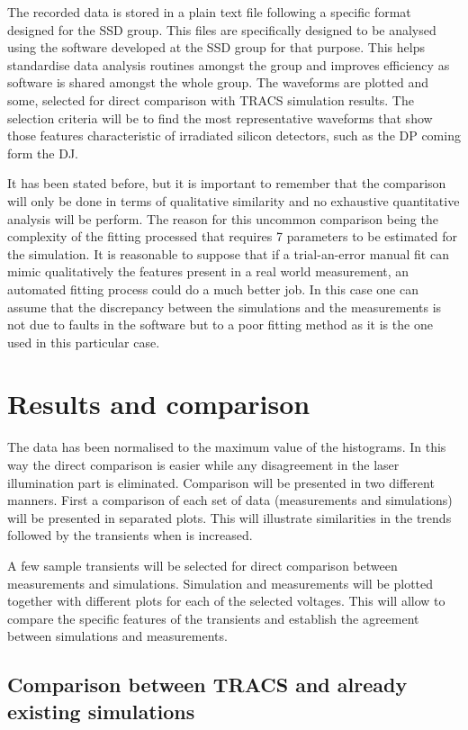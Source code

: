 The recorded data is stored in a plain text file following a specific format designed for the SSD group. This files are specifically designed to be analysed using the software developed at the SSD group for that purpose. This helps standardise data analysis routines amongst the group and improves efficiency as software is shared amongst the whole group. The waveforms are plotted and some, selected for direct comparison with TRACS simulation results. The selection criteria will be to find the most representative waveforms that show those features characteristic of irradiated silicon detectors, such as the DP coming form the DJ. 

It has been stated before, but it is important to remember that the comparison will only be done in terms of qualitative similarity and no exhaustive quantitative analysis will be perform. The reason for this uncommon comparison being the complexity of the fitting processed that requires 7 parameters to be estimated for the simulation. It is reasonable to suppose that if a trial-an-error manual fit can mimic qualitatively the features present in a real world measurement, an automated fitting process could do a much better job. In this case one can assume that the discrepancy between the simulations and the measurements is not due to faults in the software but to a poor fitting method as it is the one used in this particular case.  

\section{Results and comparison} %
\label{sec:comparison}

The data has been normalised to the maximum value of the histograms. In this way the direct comparison is easier while any disagreement in the laser illumination part is eliminated. Comparison will be presented in two different manners. First a comparison of each set of data (measurements and simulations) will be presented in separated plots. This will illustrate similarities in the trends followed by the transients when \vias is increased.

A few sample transients will be selected for direct comparison between measurements and simulations. Simulation and measurements will be plotted together with different plots for each of the selected voltages. This will allow to compare the specific features of the transients and establish the agreement between simulations and measurements.

\subsection{Comparison between TRACS and already existing simulations}

